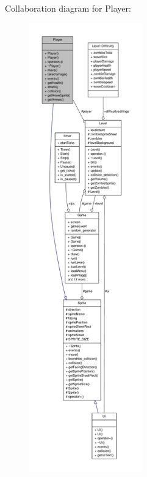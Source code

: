 Collaboration diagram for Player\-:
\nopagebreak
\begin{figure}[H]
\begin{center}
\leavevmode
\includegraphics[height=550pt]{classPlayer__coll__graph}
\end{center}
\end{figure}
